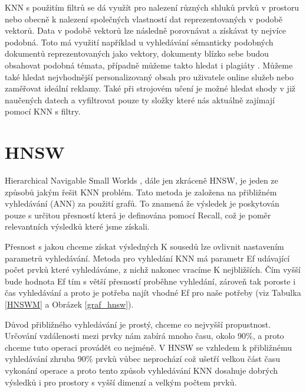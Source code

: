 \documentclass[czech,semestral,dept460,male,csharp,cpdeclaration]{diploma}
\begin{document}
		KNN s použitím filtrů se dá využít pro nalezení různých shluků prvků v prostoru nebo obecně k nalezení společných vlastností dat reprezentovaných v podobě vektorů. Data v podobě vektorů lze následně porovnávat a získávat ty nejvíce podobná. Toto má využití například u vyhledávání sémanticky podobných dokumentů reprezentovaných jako vektory, dokumenty blízko sebe budou obsahovat podobná témata, případně můžeme takto hledat i plagiáty \cite{KNN-Real-World}. Můžeme také hledat nejvhodnější personalizovaný obsah pro uživatele online služeb nebo zaměřovat ideální reklamy. Také při strojovém učení je možné hledat shody v již naučených datech a vyfiltrovat pouze ty složky které nás aktuálně zajímají pomocí KNN s filtry.
	
	\chapter{HNSW}
	\label{chap_hnsw}
	
		Hierarchical Navigable Small Worlds \cite{malkov2018efficient}, dále jen zkráceně HNSW, je jeden ze způsobů jakým řešit KNN problém. Tato metoda je založena na přibližném vyhledávání (ANN) za použití grafů. To znamená že výsledek je poskytován pouze s určitou přesností která je definována pomocí Recall, což je poměr relevantních výsledků které jsme získali.
		
		Přesnost s jakou chceme získat výsledných K sousedů lze ovlivnit nastavením parametrů vyhledávání. Metoda pro vyhledání KNN má parametr Ef udávající počet prvků které vyhledáváme, z nichž nakonec vracíme K nejbližších. Čím vyšší bude hodnota Ef tím s větší přesností proběhne vyhledání, zároveň tak poroste i čas vyhledávání a proto je potřeba najít vhodné Ef pro naše potřeby (viz Tabulka \ref{HNSWM} a Obrázek \ref{graf_hnsw}).
		
		Důvod přibližného vyhledávání je prostý, chceme co nejvyšší propustnost. Určování vzdálenosti mezi prvky nám zabírá mnoho času, okolo 90\%, a proto chceme tuto operaci provádět co nejméně. V HNSW se vzhledem k přibližnému vyhledávání zhruba 90\% prvků vůbec neprochází což ušetří velkou část času vykonání operace a proto tento způsob vyhledávání KNN dosahuje dobrých výsledků i pro prostory s vyšší dimenzí a velkým počtem prvků.
		
\end{document}
